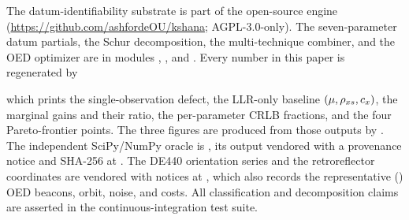 \label{sec:availability}
The datum-identifiability substrate is part of the open-source 
engine \citep{baweja2026kshana} (\url{https://github.com/ashfordeOU/kshana};
AGPL-3.0-only). The seven-parameter datum partials, the Schur decomposition, the
multi-technique combiner, and the OED optimizer are in modules
, , and . Every
number in this paper is regenerated by
\begin{quote}
\end{quote}
which prints the single-observation defect, the LLR-only baseline
$(\mu,\rho_{x s},c_x)$, the marginal gains and their ratio, the per-parameter CRLB
fractions, and the four Pareto-frontier points. The three figures are produced from
those outputs by . The independent
SciPy/NumPy oracle is , its output
vendored with a provenance notice and SHA-256 at
. The DE440 orientation series and the
retroreflector coordinates are vendored with notices at
, which also records the representative
(\Modelled) OED beacons, orbit, noise, and costs. All classification and
decomposition claims are asserted in the continuous-integration test suite.
